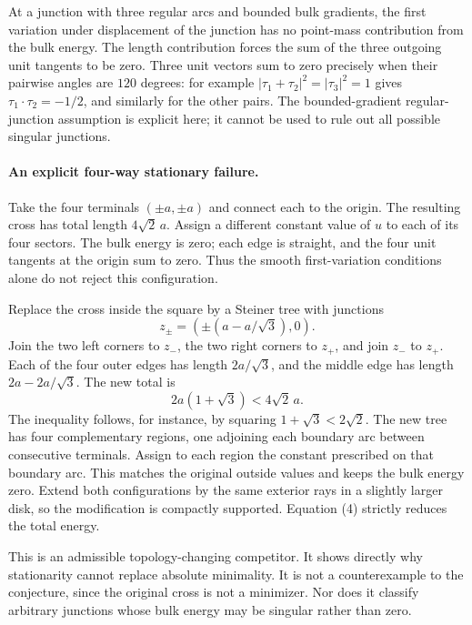\documentclass[11pt]{article}
\begin{document}
At a junction with three regular arcs and bounded bulk gradients,
the first variation under displacement of the junction has no
point-mass contribution from the bulk energy. The length contribution
forces the sum of the three outgoing unit tangents to be zero.
Three unit vectors sum to zero precisely when their pairwise angles
are $120$ degrees: for example
$|\tau_1+\tau_2|^2=|\tau_3|^2=1$ gives
$\tau_1\cdot\tau_2=-1/2$, and similarly for the other pairs.
The bounded-gradient regular-junction assumption is explicit here;
it cannot be used to rule out all possible singular junctions.

\paragraph{An explicit four-way stationary failure.}
Take the four terminals $(\pm a,\pm a)$ and connect each to the origin.
The resulting cross has total length $4\sqrt2\,a$.
Assign a different constant value of $u$ to each of its four sectors.
The bulk energy is zero; each edge is straight, and the four unit
tangents at the origin sum to zero. Thus the smooth first-variation
conditions alone do not reject this configuration.

Replace the cross inside the square by a Steiner tree with junctions
\[
                  z_\pm=(\pm(a-a/\sqrt3),0).
\]
Join the two left corners to $z_-$, the two right corners to $z_+$,
and join $z_-$ to $z_+$. Each of the four outer edges has length
$2a/\sqrt3$, and the middle edge has length $2a-2a/\sqrt3$.
The new total is
\[
                        2a(1+\sqrt3)<4\sqrt2\,a.        \tag{4}
\]
The inequality follows, for instance, by squaring
$1+\sqrt3<2\sqrt2$. The new tree has four complementary regions,
one adjoining each boundary arc between consecutive terminals.
Assign to each region the constant prescribed on that boundary arc.
This matches the original outside values and keeps the bulk energy zero.
Extend both configurations by the same exterior rays in a slightly
larger disk, so the modification is compactly supported. Equation (4)
strictly reduces the total energy.

This is an admissible topology-changing competitor. It shows directly
why stationarity cannot replace absolute minimality. It is not a
counterexample to the conjecture, since the original cross is not a
minimizer. Nor does it classify arbitrary junctions whose bulk energy
may be singular rather than zero.
\end{document}
